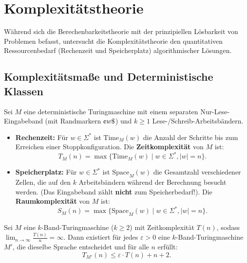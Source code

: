 \section{Komplexitätstheorie}

Während sich die Berechenbarkeitstheorie mit der prinzipiellen Lösbarkeit von Problemen befasst, untersucht die Komplexitätstheorie den quantitativen Ressourcenbedarf (Rechenzeit und Speicherplatz) algorithmischer Lösungen.

\subsection{Komplexitätsmaße und Deterministische Klassen}

\begin{definition}
    Sei $M$ eine deterministische Turingmaschine mit einem separaten Nur-Lese-Eingabeband (mit Randmarkern $\text{\textcent} w \$$) und $k \ge 1$ Lese-/Schreib-Arbeitsbändern.
    \begin{itemize}
        \item \textbf{Rechenzeit:} Für $w \in \Sigma^*$ ist $\mathrm{Time}_M(w)$ die Anzahl der Schritte bis zum Erreichen einer Stoppkonfiguration. Die \textbf{Zeitkomplexität} von $M$ ist:
        \[
            T_M(n) = \max \{\mathrm{Time}_M(w) \mid w \in \Sigma^*, |w| = n\}.
        \]
        \item \textbf{Speicherplatz:} Für $w \in \Sigma^*$ ist $\mathrm{Space}_M(w)$ die Gesamtzahl verschiedener Zellen, die auf den $k$ Arbeitsbändern während der Berechnung besucht werden. (Das Eingabeband zählt \textbf{nicht} zum Speicherbedarf!). Die \textbf{Raumkomplexität} von $M$ ist:
        \[
            S_M(n) = \max \{\mathrm{Space}_M(w) \mid w \in \Sigma^*, |w| = n\}.
        \]
    \end{itemize}
\end{definition}

\begin{theorem}
    Sei $M$ eine $k$-Band-Turingmaschine ($k \ge 2$) mit Zeitkomplexität $T(n)$, sodass $\lim_{n \to \infty} \frac{T(n)}{n} = \infty$. Dann existiert für jedes $\varepsilon > 0$ eine $k$-Band-Turingmaschine $M'$, die dieselbe Sprache entscheidet und für alle $n$ erfüllt:
    \[
        T_{M'}(n) \le \varepsilon \cdot T(n) + n + 2.
    \]
\end{theorem}

